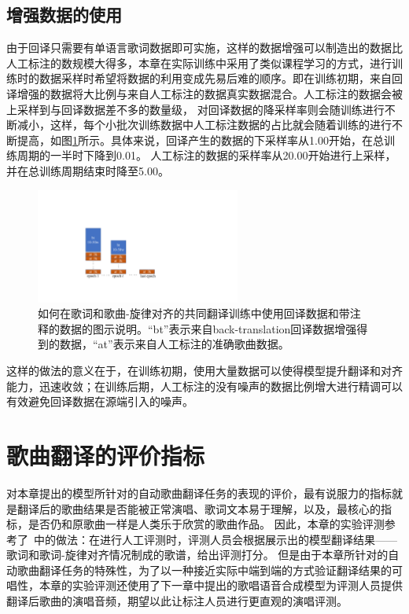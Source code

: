 \subsection{增强数据的使用}
由于回译只需要有单语言歌词数据即可实施，这样的数据增强可以制造出的数据比人工标注的数规模大得多，本章在实际训练中采用了类似课程学习的方式，进行训练时的数据采样时希望将数据的利用变成先易后难的顺序。即在训练初期，来自回译增强的数据将大比例与来自人工标注的数据真实数据混合。人工标注的数据会被上采样到与回译数据差不多的数量级，
对回译数据的降采样率则会随训练进行不断减小，这样，每个小批次训练数据中人工标注数据的占比就会随着训练的进行不断提高，如图\ref{fig:bt_curriculum}所示。具体来说，回译产生的数据的下采样率从1.00开始，在总训练周期的一半时下降到0.01。
人工标注的数据的采样率从20.00开始进行上采样，并在总训练周期结束时降至5.00。
\begin{figure}[!ht]
    \centering
    \includegraphics[width=0.6\textwidth]{figure/ast/backtrans_curriculum.pdf}
    \caption{如何在歌词和歌曲-旋律对齐的共同翻译训练中使用回译数据和带注释的数据的图示说明。``bt''表示来自back-translation回译数据增强得到的数据，``at''表示来自人工标注的准确歌曲数据。}
    \label{fig:bt_curriculum}
\end{figure}
这样的做法的意义在于，在训练初期，使用大量数据可以使得模型提升翻译和对齐能力，迅速收敛；在训练后期，人工标注的没有噪声的数据比例增大进行精调可以有效避免回译数据在源端引入的噪声。
\section{歌曲翻译的评价指标}
\label{sec:metric}
对本章提出的模型所针对的自动歌曲翻译任务的表现的评价，最有说服力的指标就是翻译后的歌曲结果是否能被正常演唱、歌词文本易于理解，以及，最核心的指标，是否仍和原歌曲一样是人类乐于欣赏的歌曲作品。
因此，本章的实验评测参考了\citet{songmass}~中的做法：在进行人工评测时，评测人员会根据展示出的模型翻译结果——歌词和歌词-旋律对齐情况制成的歌谱，给出评测打分。
但是由于本章所针对的自动歌曲翻译任务的特殊性，为了以一种接近实际中端到端的方式验证翻译结果的可唱性，本章的实验评测还使用了下一章中提出的歌唱语音合成模型为评测人员提供翻译后歌曲的演唱音频，期望以此让标注人员进行更直观的演唱评测。

